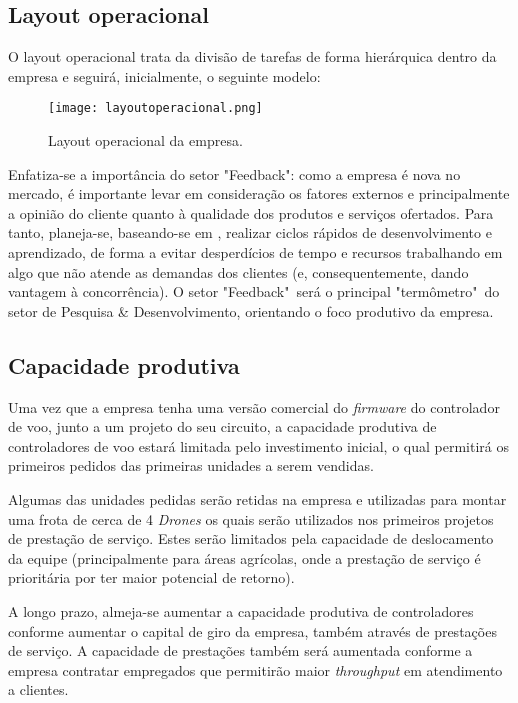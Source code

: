 \subsection{Layout operacional}

O layout operacional trata da divisão de tarefas de forma 
hierárquica dentro da empresa e seguirá, inicialmente, o seguinte
modelo:

\begin{figure}[H]
\centering
\texttt{[image: layoutoperacional.png]}
\caption{Layout operacional da empresa.}
\label{fig:layoutoperacional}
\end{figure}

Enfatiza-se a importância do setor "Feedback": como a empresa
é nova no mercado, é importante levar em consideração os 
fatores externos e principalmente a opinião do cliente quanto 
à qualidade dos produtos e serviços ofertados. Para tanto,
planeja-se, baseando-se em \cite{leanstartup}, realizar 
ciclos rápidos de desenvolvimento e aprendizado, de forma
a evitar desperdícios de tempo e recursos trabalhando em algo
que não atende as demandas dos clientes (e, consequentemente,
dando vantagem à concorrência). O setor "Feedback"\ será
o principal "termômetro"\ do setor de Pesquisa \& 
Desenvolvimento, orientando o foco produtivo da empresa.

\subsection{Capacidade produtiva}

Uma vez que a empresa tenha uma versão comercial do \emph{
firmware} do controlador de voo, junto a um projeto do seu
circuito, a capacidade produtiva de controladores de voo 
estará limitada pelo investimento inicial, o qual permitirá
os primeiros pedidos das primeiras unidades a serem vendidas.

Algumas das unidades pedidas serão retidas na empresa e 
utilizadas para montar uma frota de cerca de 4 \emph{Drones}
os quais serão utilizados nos primeiros projetos de prestação
de serviço. Estes serão limitados pela capacidade de
deslocamento da equipe (principalmente para áreas agrícolas,
onde a prestação de serviço é prioritária por ter maior
potencial de retorno).

A longo prazo, almeja-se aumentar a capacidade produtiva de
controladores conforme aumentar o capital de giro da empresa,
também através de prestações de serviço. A capacidade de 
prestações também será aumentada conforme a empresa contratar
empregados que permitirão maior \emph{throughput} em 
atendimento a clientes.

